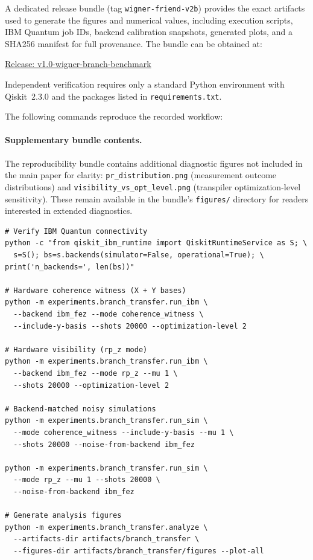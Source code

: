 \documentclass[11pt]{article}
\begin{document}
A dedicated release bundle (tag \texttt{wigner-friend-v2b}) provides the exact artifacts used to generate the figures and numerical values, including execution scripts, IBM Quantum job IDs, backend calibration snapshots, generated plots, and a SHA256 manifest for full provenance. 
The bundle can be obtained at:
  \vspace*{10pt}%

\hspace*{30pt}%
  \href{https://github.com/christopher-altman/ibm-qml-kernel/releases/tag/v1.0-wigner-branch-benchmark}{Release: v1.0-wigner-branch-benchmark}
  \vspace*{10pt}%

Independent verification requires only a standard Python environment with Qiskit~2.3.0 and the packages listed in \texttt{\texttt{requirements.txt}}.



The following commands reproduce the recorded workflow:

\paragraph{Supplementary bundle contents.}
The reproducibility bundle contains additional diagnostic figures not included in the main paper for clarity: \texttt{pr\_distribution.png} (measurement outcome distributions) and \texttt{visibility\_vs\_opt\_level.png} (transpiler optimization-level sensitivity). These remain available in the bundle's \texttt{figures/} directory for readers interested in extended diagnostics.
  \vspace*{2pt}%

\begin{verbatim}
# Verify IBM Quantum connectivity
python -c "from qiskit_ibm_runtime import QiskitRuntimeService as S; \
  s=S(); bs=s.backends(simulator=False, operational=True); \
print('n_backends=', len(bs))"

# Hardware coherence witness (X + Y bases)
python -m experiments.branch_transfer.run_ibm \
  --backend ibm_fez --mode coherence_witness \
  --include-y-basis --shots 20000 --optimization-level 2

# Hardware visibility (rp_z mode)
python -m experiments.branch_transfer.run_ibm \
  --backend ibm_fez --mode rp_z --mu 1 \
  --shots 20000 --optimization-level 2

# Backend-matched noisy simulations
python -m experiments.branch_transfer.run_sim \
  --mode coherence_witness --include-y-basis --mu 1 \
  --shots 20000 --noise-from-backend ibm_fez

python -m experiments.branch_transfer.run_sim \
  --mode rp_z --mu 1 --shots 20000 \
  --noise-from-backend ibm_fez

# Generate analysis figures
python -m experiments.branch_transfer.analyze \
  --artifacts-dir artifacts/branch_transfer \
  --figures-dir artifacts/branch_transfer/figures --plot-all
\end{verbatim}
  \vspace*{2pt}%
\end{document}
